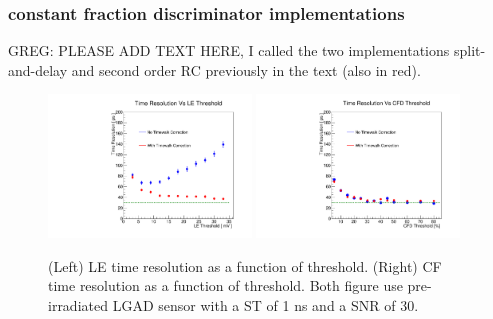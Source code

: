 \documentclass[preprint,1p]{elsarticle}
\begin{document}
\subsubsection{constant fraction discriminator implementations}\label{sed:cfd_realistic}
{\color{red}GREG: PLEASE ADD TEXT HERE, I called the two implementations split-and-delay and second order RC previously in the text (also in red)}.


  \begin{figure}[htbp]
    \centering
    \includegraphics[width=0.48\textwidth]{figs/ShapingTime1p0_SNR30_55MicronGain15Prerad_FIXED_NOISE_FIXED_SNR_V2_converted_TimeResolutionVsThresholdToT.pdf} \hfill
    \includegraphics[width=0.48\textwidth]{figs/ShapingTime1p0_SNR30_55MicronGain15Prerad_FIXED_NOISE_FIXED_SNR_V2_converted_TimeResolutionVsThresholdCFD.pdf}
    \caption{(Left) LE time resolution as a function of threshold.
    (Right) CF time resolution as a function of threshold.
    Both figure use pre-irradiated LGAD sensor with a ST of 1 ns and a SNR of 30.}
    \label{fig:time_resolution_scan}
  \end{figure}
\end{document}
